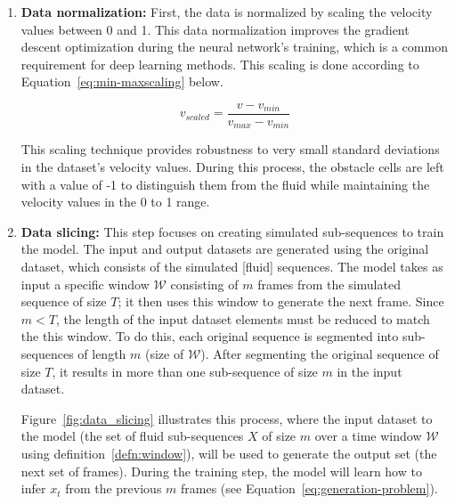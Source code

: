 \begin{enumerate}
    \item \textbf{Data normalization:} First, the data is normalized by scaling the velocity values between 0 and 1. This data normalization improves the gradient descent optimization during the neural network's training, which is a common requirement for deep learning methods. This scaling is done according to Equation~\ref{eq:min-maxscaling} below.

        \begin{equation}
            v_{scaled} = \frac{v-v_{min}}{v_{max} - v_{min}}
            \label{eq:min-maxscaling}
        \end{equation}
    
    This scaling technique provides robustness to very small standard deviations in the dataset's velocity values. During this process, the obstacle cells are left with a value of -1 to distinguish them from the fluid while maintaining the velocity values in the 0 to 1 range.
    
    \item \textbf{Data slicing:} This step focuses on creating simulated sub-sequences to train the model. The input and output datasets are generated using the original dataset, which consists of the simulated [fluid] sequences. The model takes as input a specific window $\mathcal{W}$ consisting of $m$ frames from the simulated sequence of size $T$; it then uses this window to generate the next frame. Since $m<T$, the length of the input dataset elements must be reduced to match the this window. To do this, each original sequence is segmented into sub-sequences of length $m$ (size of $\mathcal{W}$). After segmenting the original sequence of size $T$, it results in more than one sub-sequence of size $m$ in the input dataset.
    
    Figure~\ref{fig:data_slicing} illustrates this process, where the input dataset to the model (the set of fluid sub-sequences $X$ of size $m$ over a time window $\mathcal{W}$ using definition~\ref{defn:window}), will be used to generate the output set (the next set of frames). During the training step, the model will learn how to infer $x_t$ from the previous $m$ frames (see  Equation~\ref{eq:generation-problem}).
 

\end{enumerate}
